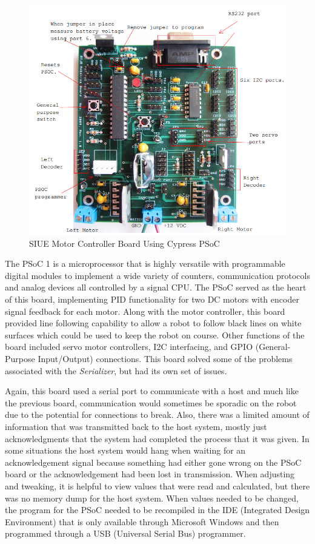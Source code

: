 \documentclass[12pt,oneside,final]{siuethesis}
\theoremstyle{definition}
\begin{document}
\begin{figure}[htbp!]
\centering
\includegraphics[scale=.75,keepaspectratio=true]{./images/PSoC_board.png}
\caption{SIUE Motor Controller Board Using Cypress PSoC}
\label{fig:PSoC_board}
\end{figure}


The PSoC 1 is a microprocessor that is highly versatile with programmable digital modules to implement a wide variety of counters, communication protocols and analog devices all controlled by a signal CPU. The PSoC served as the heart of this board, implementing PID functionality for two DC motors with encoder signal feedback for each motor.  Along with the motor controller, this board provided line following capability to allow a robot to follow black lines on white surfaces which could be used to keep the robot on course.  Other functions of the board included servo motor controllers, I2C interfacing, and GPIO (General-Purpose Input/Output) connections. This board solved some of the problems associated with the \emph{Serializer}, but had its own set of issues. 

Again, this board used a serial port to communicate with a host and much like the previous board, communication would sometimes be sporadic on the robot due to the potential for connections to break.  Also, there was a limited amount of information that was transmitted back to the host system, mostly just acknowledgments that the system had completed the process that it was given. In some situations the host system would hang when waiting for an acknowledgement signal because something had either gone wrong on the PSoC board or the acknowledgement had been lost in transmission. When adjusting and tweaking, it is helpful to view values that were read and calculated, but there was no memory dump for the host system. When values needed to be changed, the program for the PSoC needed to be recompiled in the IDE (Integrated Design Environment) that is only available through Microsoft Windows and then programmed through a USB (Universal Serial Bus) programmer. 
\end{document}
